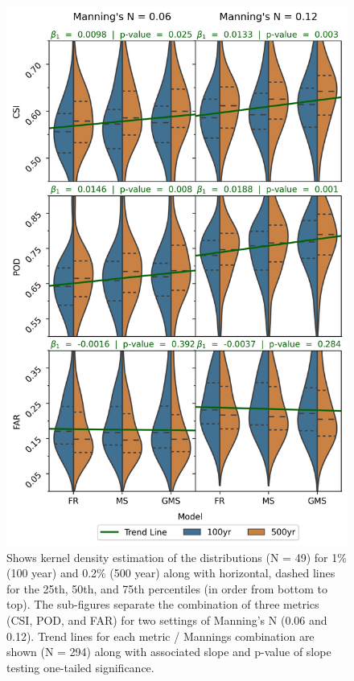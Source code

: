 \begin{figure}[h!]
\centering
\includegraphics[scale=0.9]{figures/violin_plots.jpg}
\caption{Shows kernel density estimation of the distributions (N = 49) for 1\% (100 year) and 0.2\% (500 year) along with horizontal, dashed lines for the 25th, 50th, and 75th percentiles (in order from bottom to top).
The sub-figures separate the combination of three metrics (CSI, POD, and FAR) for two settings of Manning's N (0.06 and 0.12).
Trend lines for each metric / Mannings combination are shown (N = 294) along with associated slope and p-value of slope testing one-tailed significance.}
\label{fig:violin_plot}
\end{figure}
%

